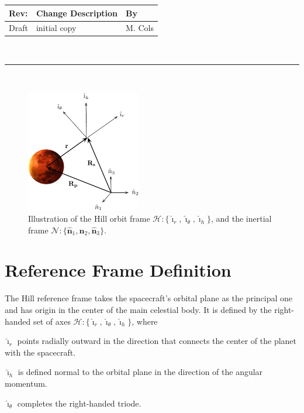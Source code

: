 \documentclass[]{AVSSimReportMemo}
\begin{document}
\makeCover


%
%
\pagestyle{empty}
{\renewcommand{\arraystretch}{2}
\noindent
\begin{longtable}{|p{0.5in}|p{4.5in}|p{1.14in}|}
\hline
{\bfseries Rev}: & {\bfseries Change Description} & {\bfseries By} \\
\hline
Draft & initial copy & M. Cols \\
\hline

\end{longtable}
}

\newpage
\setcounter{page}{1}
\pagestyle{fancy}

\tableofcontents
~\\ \hrule ~\\

\begin{figure}[htb]
	\centerline{
	\includegraphics[width=5cm]{Figures/hillPoint}
	}
	\caption{Illustration of the Hill orbit frame $\mathcal{H}:\{ \hat{\bm\imath}_{r}, \hat{\bm\imath}_{\theta}, \hat{\bm\imath}_{h} \}$, and the inertial frame $\mathcal{N}:\{ \hat{\bm n}_{1}, \hat{\bm n}_{2}, \hat{\bm n}_{3} \}$.}
	\label{fig:Fig1}
\end{figure}

\section{Reference Frame Definition}
The Hill reference frame takes the spacecraft's orbital plane as the principal one and has origin in the center of the main celestial body. It is defined by the right-handed set of axes $\mathcal{H}:\{ \hat{\bm\imath}_{r}, \hat{\bm\imath}_{\theta}, \hat{\bm\imath}_{h} \}$, where\par
$\hat {\bm\imath}_{r}$  points radially outward in the direction that connects the center of the planet with the spacecraft. \par
$\hat {\bm\imath}_{h}$ is defined normal to the orbital plane in the direction of the angular momentum. \par
$\hat {\bm\imath}_{\theta}$ completes the right-handed triode.
\end{document}
